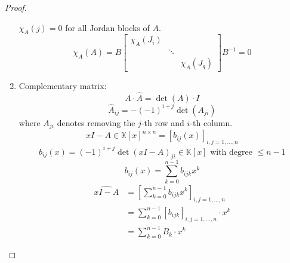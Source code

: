 \documentclass{article}
\begin{document}
\begin{proof}
\begin{enumerate}
      $\chi_A(j) = 0$ for all Jordan blocks of $A$.
      \[ \chi_A(A) = B \begin{bmatrix} \chi_A(J_i) & & \\ & \ddots & \\ & & \chi_A(J_q) \end{bmatrix} B^{-1} = 0 \]
    \item {} Complementary matrix:
      \[ A \cdot \widehat{A} = \det(A) \cdot I \]
      \[ \widehat{A}_{ij} = -(-1)^{i+j} \det(A_{ji}) \]
      where $A_{ji}$ denotes removing the $j$-th row and $i$-th column.
      \[ \widehat{xI - A} \in \mathbb K[x]^{n \times n} = [b_{ij}(x)]_{i,j=1,\dots,n} \]
      \[ b_{ij}(x) = (-1)^{i+j} \det(xI - A)_{ji} \in \mathbb K[x] \text{ with degree } \leq n-1 \]
      \[ b_{ij}(x) = \sum_{k=0}^{n-1} b_{ijk} x^k \]
      \begin{align*}
        \widehat{xI - A} &= \left[\sum_{k=0}^{n-1} b_{ijk} x^k\right]_{i,j=1,\dots,n} \\
          &= \sum_{k=0}^{n-1} [b_{ijk}]_{i,j=1,\dots,n} \cdot x^k \\
          &= \sum_{k=0}^{n-1} B_k \cdot x^k
      \end{align*}


\end{enumerate}
\end{proof}
\end{document}
